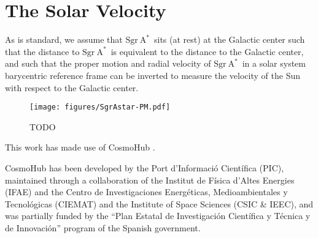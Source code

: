 \documentclass[modern]{aastex631}
\newcommand{\sgrA}{\ensuremath{\textrm{Sgr}~\textrm{A}^{*}}}
\begin{document}
\section{The Solar Velocity} \label{sec:vel}

As is standard, we assume that \sgrA\ sits (at rest) at the Galactic center such
that the distance to \sgrA\ is equivalent to the distance to the Galactic
center, and such that the proper motion and radial velocity of \sgrA\ in a solar
system barycentric reference frame can be inverted to measure the velocity of
the Sun with respect to the Galactic center.


\begin{figure}
    \begin{centering}
        \texttt{[image: figures/SgrAstar-PM.pdf]}
        \caption{TODO}
        \label{fig:SgrAstar-PM}
    \end{centering}
\end{figure}

\begin{acknowledgements}
    This work has made use of CosmoHub \citep{Tallada:2020, Carretero:2017}.

    CosmoHub has been developed by the Port d'Informaci\'{o} Cient\'{i}fica (PIC), maintained through a collaboration of the Institut de F\'{i}sica d'Altes Energies (IFAE) and the Centro de Investigaciones Energ\'{e}ticas, Medioambientales y Tecnol\'{o}gicas (CIEMAT) and the Institute of Space Sciences (CSIC & IEEC), and was partially funded by the ``Plan Estatal de Investigaci\'{o}n Cient\'{i}fica y T\'{e}cnica y de Innovaci\'{o}n'' program of the Spanish government.

\end{acknowledgements}



\end{document}
